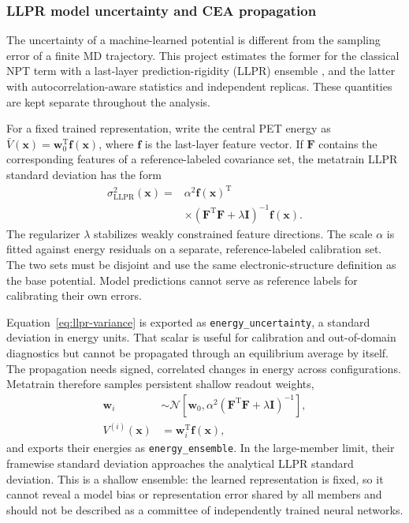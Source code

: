 \documentclass[10pt,a4paper,twocolumn]{article}
\begin{document}
\subsubsection{LLPR model uncertainty and CEA propagation}
\label{sec:llpr-cea}

The uncertainty of a machine-learned potential is different from the sampling
error of a finite MD trajectory. This project estimates the former for the
classical NPT term with a last-layer prediction-rigidity (LLPR) ensemble
\cite{bigi2024}, and the latter with autocorrelation-aware statistics and
independent replicas. These quantities are kept separate throughout the
analysis.

For a fixed trained representation, write the central PET energy as
$\bar V(\bm x)=\bm w_0^{\mathrm T}\bm f(\bm x)$, where $\bm f$ is the
last-layer feature vector. If $\bm F$ contains the corresponding features of a
reference-labeled covariance set, the metatrain LLPR standard deviation has
the form
\begin{equation}
  \begin{aligned}
  \sigma_{\mathrm{LLPR}}^2(\bm x)
  ={}&\alpha^2\bm f(\bm x)^{\mathrm T}
  \\
  &\times\left(\bm F^{\mathrm T}\bm F
        +\lambda\bm I\right)^{-1}\bm f(\bm x).
  \end{aligned}
  \label{eq:llpr-variance}
\end{equation}
The regularizer $\lambda$ stabilizes weakly constrained feature directions.
The scale $\alpha$ is fitted against energy residuals on a separate,
reference-labeled calibration set. The two sets must be disjoint and use the
same electronic-structure definition as the base potential. Model predictions
cannot serve as reference labels for calibrating their own errors.

Equation~\eqref{eq:llpr-variance} is exported as
\texttt{energy\_uncertainty}, a standard deviation in energy units. That
scalar is useful for calibration and out-of-domain diagnostics but cannot be
propagated through an equilibrium average by itself. The propagation needs
signed, correlated changes in energy across configurations. Metatrain
therefore samples persistent shallow readout weights,
\begin{equation}
  \begin{aligned}
  \bm w_i&\sim\mathcal N\!\left[
    \bm w_0,
    \alpha^2\left(\bm F^{\mathrm T}\bm F
                         +\lambda\bm I\right)^{-1}\right],
  \\
  V^{(i)}(\bm x)&=\bm w_i^{\mathrm T}\bm f(\bm x),
  \end{aligned}
  \label{eq:llpr-members}
\end{equation}
and exports their energies as \texttt{energy\_ensemble}. In the large-member
limit, their framewise standard deviation approaches the analytical LLPR
standard deviation. This is a shallow ensemble: the learned representation is
fixed, so it cannot reveal a model bias or representation error shared by all
members and should not be described as a committee of independently trained
neural networks.
\end{document}
